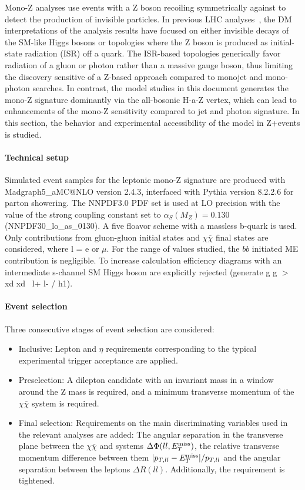 Mono-Z analyses use events with a Z boson recoiling symmetrically against \MET to detect the production of invisible particles.
In previous LHC analyses~\cite{Aaboud:2017bja,Sirunyan:2017qfc}, the DM interpretations of the analysis results have focused on either invisible decays of the SM-like Higgs bosons or topologies where the Z boson is produced as initial-state radiation (ISR) off a quark. The ISR-based topologies generically favor radiation of a gluon or photon rather than a massive gauge boson, thus limiting the discovery sensitive of a Z-based approach compared to monojet and mono-photon searches. In contrast, the model studies in this document generates the mono-Z signature dominantly via the all-bosonic H-a-Z vertex, which can lead to enhancements of the mono-Z sensitivity compared to jet and photon signature. In this section, the behavior and experimental accessibility of the model in Z+\MET events is studied.

\paragraph{Technical setup}
Simulated event samples for the leptonic mono-Z signature are produced with Madgraph5\_aMC@NLO version 2.4.3, interfaced with Pythia version 8.2.2.6 for parton showering. The NNPDF3.0 PDF set is used at LO precision with the value of the strong coupling constant set to $\alpha_{S}(M_{Z}) = 0.130$ (NNPDF30\_lo\_as\_0130). A five floavor scheme with a massless b-quark is used.  Only contributions from gluon-gluon initial states and \lp\lm$\chi\overline{\chi}$ final states are considered, where l = e or $\mu$.  For the range of \tanb values studied, the $bb$ initiated ME contribution is negligible.  To increase calculation efficiency diagrams with an intermediate s-channel SM Higgs boson are explicitly rejected (generate g g $>$ xd xd~ l+ l- / h1).


\paragraph{Event selection}
Three consecutive stages of event selection are considered:
\begin{itemize}
\item Inclusive: Lepton \pt and $\eta$ requirements corresponding to the typical experimental trigger acceptance are applied.

\item Preselection: A dilepton candidate with an invariant mass in a window around the Z mass is required, and a minimum transverse momentum of the $\chi\overline{\chi}$ system is required.

\item Final selection: Requirements on the main discriminating variables used in the relevant analyses are added: The angular separation in the transverse plane between the $\chi\overline{\chi}$ and \lp\lm systems $\Delta\Phi(ll,E_T^\mathrm{miss})$, the relative transverse momentum difference between them $|p_{T,ll} - E_T^\mathrm{miss}|/p_{T,ll}$ and the angular separation between the leptons $\Delta R(ll)$. Additionally, the \MET requirement is tightened.
\end{itemize}

